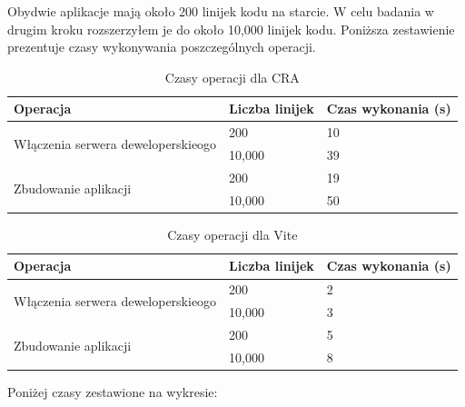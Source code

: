 \documentclass{article}
\begin{document}
Obydwie aplikacje mają około 200 linijek kodu na starcie. W celu badania w drugim kroku rozszerzyłem je do około 10,000 linijek kodu. Poniższa zestawienie prezentuje czasy wykonywania poszczególnych operacji.

\begin{table}[H]
\centering
\begin{tabular}{|l|l|l|}
\hline
\textbf{Operacja} & \textbf{Liczba linijek} & \textbf{Czas wykonania (s)} \\ \hline
\multirow{2}{*}{Włączenia serwera deweloperskieogo} & 200 & 10 \\ 
& 10,000 & 39 \\ \hline
\multirow{2}{*}{Zbudowanie aplikacji} & 200 & 19 \\ 
& 10,000 & 50 \\ \hline
\end{tabular}
\caption{Czasy operacji dla CRA}
\label{tab:czas_wykonania}
\end{table}

\begin{table}[H]
\centering
\begin{tabular}{|l|l|l|}
\hline
\textbf{Operacja} & \textbf{Liczba linijek} & \textbf{Czas wykonania (s)} \\ \hline
\multirow{2}{*}{Włączenia serwera deweloperskieogo} & 200 & 2 \\ 
& 10,000 & 3 \\ \hline
\multirow{2}{*}{Zbudowanie aplikacji} & 200 & 5 \\ 
& 10,000 & 8 \\ \hline
\end{tabular}
\caption{Czasy operacji dla Vite}
\label{tab:czas_wykonania}
\end{table}


Poniżej czasy zestawione na wykresie:
\end{document}
